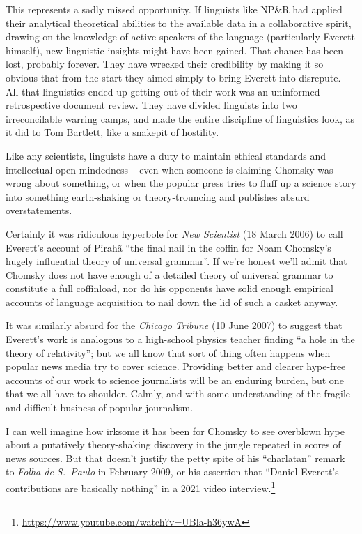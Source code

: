 \documentclass[output=paper,colorlinks,citecolor=brown
]{langscibook}
\begin{document}
This represents a sadly missed opportunity. If linguists like NP\&R
had applied their analytical theoretical abilities to the available
data in a collaborative spirit, drawing on the knowledge of active
speakers of the language (particularly Everett himself), new linguistic
insights might have been gained. That chance has been lost, probably
forever. They have wrecked their credibility by making it so obvious
that from the start they aimed simply to bring Everett into disrepute.
All that linguistics ended up getting out of their work was an
uninformed retrospective document review. They have divided linguists
into two irreconcilable warring camps, and made the entire discipline
of linguistics look, as it did to Tom Bartlett, like a snakepit of
hostility.

Like any scientists, linguists have a duty to maintain ethical
standards and intellectual open-mindedness -- even when someone is
claiming Chomsky was wrong about something, or when the popular
press tries to fluff up a science story into something earth-shaking
or theory-trouncing and publishes absurd overstatements.

Certainly it was ridiculous hyperbole for
\textit{New Scientist} (18 March 2006)
to call Everett's account of Pirahã ``the final nail in the
coffin for Noam Chomsky's hugely influential theory of universal
grammar''. If we're honest we'll admit that Chomsky does not have
enough of a detailed theory of universal grammar to constitute a full
coffinload, nor do his opponents have solid enough empirical accounts
of language acquisition to nail down the lid of such a casket anyway.

It was similarly absurd for the
\textit{Chicago Tribune} (10 June 2007)
to suggest that Everett's work is analogous to a high-school physics
teacher finding ``a hole in the theory of relativity''; but we all know
that sort of thing often happens when popular news media try to cover
science. Providing better and clearer hype-free accounts of our work
to science journalists will be an enduring burden, but one that we
all have to shoulder. Calmly, and with some understanding of the
fragile and difficult business of popular journalism.

I can well imagine how irksome it has been for Chomsky to see overblown
hype about a putatively theory-shaking discovery in the jungle repeated
in scores of news sources. But that doesn't justify the petty spite of
his ``charlatan'' remark to \textit{Folha de S.~Paulo} in February 2009,
or his assertion that ``Daniel Everett's contributions are basically
nothing'' in a 2021 video interview.\footnote{%
   \url{https://www.youtube.com/watch?v=UBla-h36ywA}}
\end{document}
